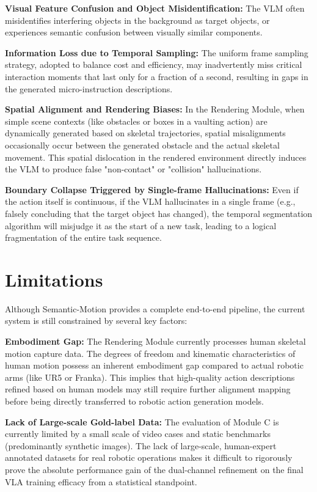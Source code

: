 \documentclass[11pt,oneside]{report}
\begin{document}
\textbf{Visual Feature Confusion and Object Misidentification:} The VLM often misidentifies interfering objects in the background as target objects, or experiences semantic confusion between visually similar components.

\textbf{Information Loss due to Temporal Sampling:} The uniform frame sampling strategy, adopted to balance cost and efficiency, may inadvertently miss critical interaction moments that last only for a fraction of a second, resulting in gaps in the generated micro-instruction descriptions.

\textbf{Spatial Alignment and Rendering Biases:} In the Rendering Module, when simple scene contexts (like obstacles or boxes in a vaulting action) are dynamically generated based on skeletal trajectories, spatial misalignments occasionally occur between the generated obstacle and the actual skeletal movement. This spatial dislocation in the rendered environment directly induces the VLM to produce false "non-contact" or "collision" hallucinations.

\textbf{Boundary Collapse Triggered by Single-frame Hallucinations:} Even if the action itself is continuous, if the VLM hallucinates in a single frame (e.g., falsely concluding that the target object has changed), the temporal segmentation algorithm will misjudge it as the start of a new task, leading to a logical fragmentation of the entire task sequence.

\section{Limitations}
Although Semantic-Motion provides a complete end-to-end pipeline, the current system is still constrained by several key factors:

\textbf{Embodiment Gap:} The Rendering Module currently processes human skeletal motion capture data. The degrees of freedom and kinematic characteristics of human motion possess an inherent embodiment gap compared to actual robotic arms (like UR5 or Franka). This implies that high-quality action descriptions refined based on human models may still require further alignment mapping before being directly transferred to robotic action generation models.

\textbf{Lack of Large-scale Gold-label Data:} The evaluation of Module C is currently limited by a small scale of video cases and static benchmarks (predominantly synthetic images). The lack of large-scale, human-expert annotated datasets for real robotic operations makes it difficult to rigorously prove the absolute performance gain of the dual-channel refinement on the final VLA training efficacy from a statistical standpoint.
\end{document}
